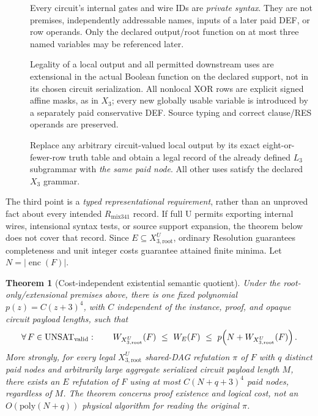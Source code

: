 \documentclass[11pt]{article}
\newtheorem{theorem}{Theorem}
\begin{document}
\begin{description}
\item[] Every circuit's internal gates and wire IDs are \emph{private syntax}. They are not premises, independently addressable names, inputs of a later paid DEF, or row operands. Only the declared output/root function on at most three named variables may be referenced later.
\item[] Legality of a local output and all permitted downstream uses are extensional in the actual Boolean function on the declared support, not in its chosen circuit serialization. All nonlocal XOR rows are explicit signed affine masks, as in $X_3$; every new globally usable variable is introduced by a separately paid conservative DEF. Source typing and correct clause/RES operands are preserved.
\item[] Replace any arbitrary circuit-valued local output by its exact eight-or-fewer-row truth table and obtain a legal record of the already defined $L_3$ subgrammar with \emph{the same paid node}. All other uses satisfy the declared $X_3$ grammar.
\end{description}

The third point is a \emph{typed representational requirement}, rather than an unproved fact about every intended $R_{\mathrm{mix341}}$ record. If full U permits exporting internal wires, intensional syntax tests, or source support expansion, the theorem below does not cover that record. Since $E\subseteq X_{3,\mathrm{root}}^U$, ordinary Resolution guarantees completeness and unit integer costs guarantee attained finite minima. Let $N=|\operatorname{enc}(F)|$.

\begin{theorem}[Cost-independent existential semantic quotient]\label{thm:main}
Under the root-only/extensional premises above, there is one fixed polynomial $p(z)=C(z+3)^4$, with $C$ independent of the instance, proof, and opaque circuit payload lengths, such that
\[
\forall\,F\in\mathrm{UNSAT}_{\rm valid}:
\qquad W_{X_{3,\mathrm{root}}^U}(F)
\ \le\ W_E(F)\
\le\ p\!\left(N+W_{X_{3,\mathrm{root}}^U}(F)\right).
\]
More strongly, for \emph{every} legal $X_{3,\mathrm{root}}^U$ shared-DAG refutation $\pi$ of $F$ with $q$ distinct paid nodes and arbitrarily large aggregate serialized circuit payload length $M$, there \emph{exists} an $E$ refutation of $F$ using at most $C(N+q+3)^4$ paid nodes, regardless of $M$. The theorem concerns proof existence and logical cost, \emph{not} an $O(\mathrm{poly}(N+q))$ physical algorithm for reading the original $\pi$.
\end{theorem}
\end{document}
